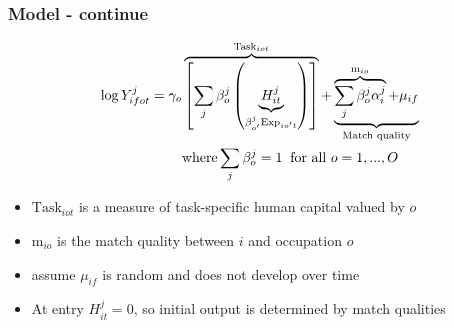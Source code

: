 \documentclass[11pt]{beamer}
\begin{document}
\begin{frame}
	\frametitle{Model - continue}
\begin{align}
	\label{eq:eq9}
	\log{Y_{ifot}^j} = \gamma_o&\overbrace{\left[  \sum_j \beta_{o}^j \left( \underbrace{H_{it}^{j}}_{\beta_{o'}^j \text{Exp}_{io't}}\right)  \right]}^{\text{Task}_{iot}} + \underbrace{\overbrace{\sum_j \beta_{o}^j \alpha_{i}^j }^{\text{m}_{io}}+\mu_{if}}_{\text{Match quality}}\\
	&\text{where} \sum_{j} \beta_{o}^j = 1 \;\;\text{for all }o=1,...,O \notag
\end{align}

	
	\begin{itemize}
		\item $\text{Task}_{iot}$ is a measure of task-specific human capital valued by $o$
		\item $\text{m}_{io}$ is the match quality between $i$ and occupation $o$
		\item assume $\mu_{if}$ is random and does not develop over time
		\item At entry $H_{it}^j=0$, so  initial output is determined by match qualities
	\end{itemize}
	
\end{frame}
\end{document}
